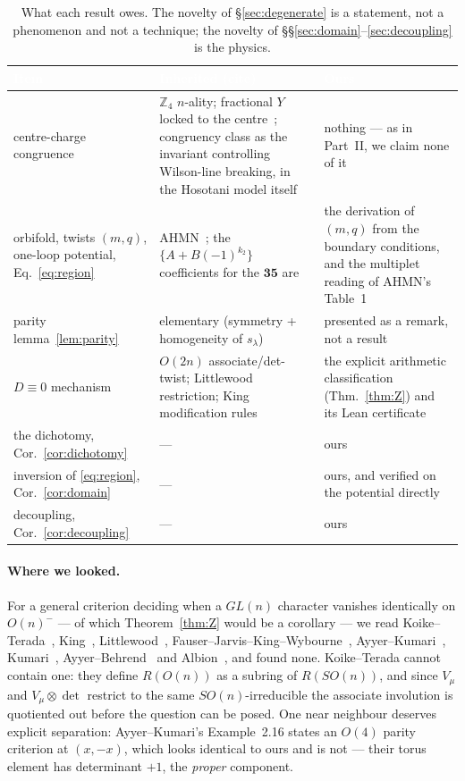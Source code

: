 \documentclass[11pt,a4paper]{article}
\newcommand{\ZZ}{\mathbb{Z}}
\begin{document}
\begin{table}[h]
\centering\small
\begin{tabular}{p{4.0cm}p{5.0cm}p{5.2cm}}
\toprule
\rowcolor{hdrblue}
\textcolor{white}{Item} & \textcolor{white}{Inherited (cite)} & \textcolor{white}{Ours}\\
\midrule
centre-charge congruence &
$\ZZ_4$ $n$-ality; fractional $Y$ locked to the centre~\cite{Hucks,Saller,Tong,Alonso,Slansky};
congruency class as the invariant controlling Wilson-line breaking, in the Hosotani model
itself~\cite{DaviesMcLachlan1,DaviesMcLachlan2} &
nothing --- as in Part~II, we claim none of it\\
\midrule
\rowcolor{softgrey}
orbifold, twists $(m,q)$, one-loop potential, Eq.~\eqref{eq:region} &
AHMN~\cite{AHMN,AHMN23}; the $\{A+B(-1)^{k_2}\}$ coefficients for the $\mathbf{35}$ are
\cite[Eq.~(3.25)]{AHMN23} &
the derivation of $(m,q)$ from the boundary conditions, and the multiplet reading of
AHMN's Table~1\\
\midrule
parity lemma~\ref{lem:parity} &
elementary (symmetry + homogeneity of $s_\lambda$) & presented as a remark, not a result\\
\midrule
\rowcolor{softgrey}
$D\equiv0$ mechanism &
$O(2n)$ associate/det-twist; Littlewood restriction; King modification rules~\cite{King71,Newell,Brauer,AyyerBehrend} &
the explicit arithmetic classification (Thm.~\ref{thm:Z}) and its Lean certificate\\
\midrule
the dichotomy, Cor.~\ref{cor:dichotomy} & --- & ours\\
\midrule
\rowcolor{softgrey}
inversion of \eqref{eq:region}, Cor.~\ref{cor:domain} & --- & ours, and verified on the potential directly\\
\midrule
decoupling, Cor.~\ref{cor:decoupling} & --- & ours\\
\bottomrule
\end{tabular}
\caption{What each result owes. The novelty of \S\ref{sec:degenerate} is a statement, not a
phenomenon and not a technique; the novelty of \S\S\ref{sec:domain}--\ref{sec:decoupling} is
the physics.}
\label{tab:ledger}
\end{table}

\paragraph{Where we looked.} For a general criterion deciding when a $GL(n)$ character
vanishes identically on $O(n)^-$ --- of which Theorem~\ref{thm:Z} would be a corollary --- we
read Koike--Terada~\cite{KoikeTerada}, King~\cite{King71b}, Littlewood~\cite{Littlewood58},
Fauser--Jarvis--King--Wybourne~\cite{FJKW}, Ayyer--Kumari~\cite{AyyerKumari},
Kumari~\cite{Kumari}, Ayyer--Behrend~\cite{AyyerBehrend} and Albion~\cite{Albion}, and found
none. Koike--Terada cannot contain one: they define $R(O(n))$ as a subring of $R(SO(n))$, and
since $V_\mu$ and $V_\mu\otimes\det$ restrict to the same $SO(n)$-irreducible the associate
involution is quotiented out before the question can be posed. One near neighbour deserves
explicit separation: Ayyer--Kumari's Example~2.16 states an $O(4)$ parity criterion at
$(x,-x)$, which looks identical to ours and is not --- their torus element has determinant
$+1$, the \emph{proper} component.
\end{document}
